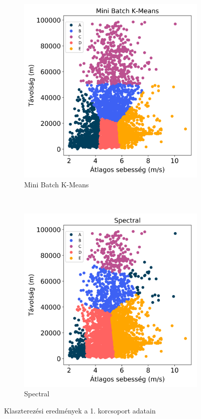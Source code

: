 \begin{figure}[!h]
\begin{subfigure}{.5\linewidth}
		\includegraphics[width=\textwidth,keepaspectratio]{kepek/clustering/age_group_1_minibatch_results.png}
		\caption{Mini Batch K-Means}
		\label{subfig:clusteringAgeGroupOneMiniBatch}
	\end{subfigure}\\[1ex]
	\begin{subfigure}{.5\linewidth}
		\centering
		\includegraphics[width=\textwidth,keepaspectratio]{kepek/clustering/age_group_1_spectral_results.png}
		\caption{Spectral}
		\label{subfig:clusteringAgeGroupOneSpectral}
	\end{subfigure}
	\caption{Klaszterezési eredmények a 1. korcsoport adatain}
	\label{fig:clusteringAgeGroupOne}
\end{figure}

